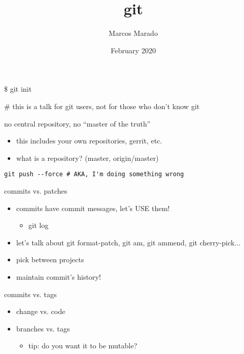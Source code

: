 \documentclass[landscape]{slides}
\author{Marcos Marado}
\title{git}
\date{February 2020}
\begin{document}
\begin{slide}
\maketitle
\end{slide}

\begin{slide}
\$ git init

\# this is a talk for git users, not for those who don't know git
\end{slide}

\begin{slide}
no central repository, no ``master of the truth''

\begin{itemize}
\item{} this includes your own repositories, gerrit, etc.
\item{} what is a repository? (master, origin/master)
\end{itemize}
\end{slide}

\begin{slide}
\begin{verbatim}
git push --force # AKA, I'm doing something wrong
\end{verbatim}
\end{slide}

\begin{slide}
commits vs. patches

\begin{itemize}
\item{} commits have commit messages, let's USE them!
	\begin{itemize}
	\item{} git log
	\end{itemize}
\item{} let's talk about git format-patch, git am, git ammend, git cherry-pick...
\item{} pick between projects
\item{} maintain commit's history!
\end{itemize}
\end{slide}

\begin{slide}
commits vs. tags

\begin{itemize}
\item{} change vs. code
\item{} branches vs. tags
\begin{itemize}
\item{} tip: do you want it to be mutable?
\end{itemize}
\end{itemize}
\end{slide}
\end{document}
